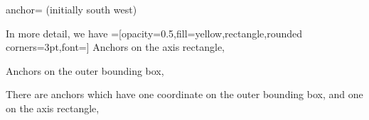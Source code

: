 \begin{pgfplotskey}{anchor= (initially south west)}
{%
\plottable
\def\plot{%
	\begin{axis}[
		width=5cm,
		name=test plot,
		xlabel=$x$,
		ylabel={$y$},%
		y label style={yshift=-15pt},
		legend style={at={(1.03,1)},anchor=north west},
		title=A test plot.
	]
		\addplot table from{\plottable};
		\addlegendentry{$f(x)$}
		\addplot[red] plot[id=gnuplot_ppp,domain=-40:40,samples=120] gnuplot{10000*sin(x/3)};
		\addlegendentry{$g(x)$}
	\end{axis}
}%
\def\showit#1#2{%
	\node[pin=#2:(s.#1),fill=black,circle,scale=0.3] at (test plot.#1) {};
}%
In more detail, we have
=[opacity=0.5,fill=yellow,rectangle,rounded corners=3pt,font=\tiny]
Anchors on the axis rectangle,
		\begin{center}
		\end{center}
Anchors on the outer bounding box,
		\begin{center}
		\end{center}
There are anchors which have one coordinate on the outer bounding box, and one on the axis rectangle,
		\begin{center}
\end{center}}
\end{pgfplotskey}
